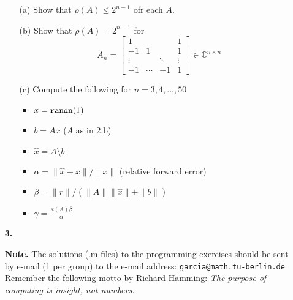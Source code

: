 \documentclass[10pt]{report}
\begin{document}
\begin{enumerate}
  \begin{enumerate}
    \item[(a)] Show that $\rho(A)\leq2^{n-1}$ ofr each $A$.
    \item[(b)] Show that $\rho(A)=2^{n-1}$ for
    \[A_n=\left[\begin{array}{rccc}1&&&1\\-1&1&&1\\\vdots&&\ddots&\vdots\\-1&\cdots&-1&1\end{array}\right]\in\mathbb{C}^{n\times n}\]
    \item[(c)]Compute the following for $n=3,4,...,50$
      \begin{itemize}
        \item $x=\verb+randn+(1)$
        \item $b=Ax$ ($A$ as in 2.b)
        \item $\hat{x}=A\setminus b$
        \item $\alpha=\|\hat{x}-x\|/\|x\|$ (relative forward error)
        \item $\beta=\|r\|/(\|A\|\|\hat{x}\|+\|b\|)$
        \item $\gamma=\frac{\kappa(A)\beta}{\alpha}$
        \end{itemize}
  \end{enumerate}

\vspace{0.1cm} 

\item[\textbf{3.}] 

\vspace{0.1cm} 

\item[\textbf{Note.}] The solutions (.m files) to the programming exercises should be sent by e-mail (1 per group) to the e-mail address: \verb+garcia@math.tu-berlin.de+ \\

Remember the following motto by Richard Hamming: 
\textit{The purpose of computing is insight, not numbers.}

\end{enumerate}
\end{document}

